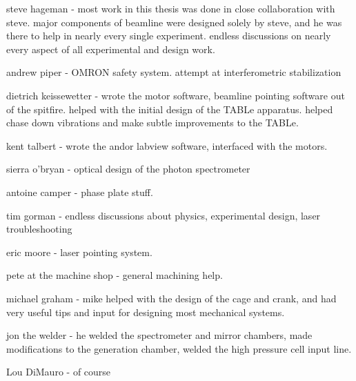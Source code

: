 \begin{acknowledgments}

steve hageman - most work in this thesis was done in close collaboration with steve. major components of beamline were designed solely by steve, and he was there to help in nearly every single experiment. endless discussions on nearly every aspect of all experimental and design work.

andrew piper - OMRON safety system. attempt at interferometric stabilization

dietrich keissewetter - wrote the motor software, beamline pointing software out of the spitfire. helped with the initial design of the TABLe apparatus. helped chase down vibrations and make subtle improvements to the TABLe.

kent talbert - wrote the andor labview software, interfaced with the motors.

sierra o'bryan - optical design of the photon spectrometer

antoine camper - phase plate stuff.

tim gorman - endless discussions about physics, experimental design, laser 
troubleshooting

eric moore - laser pointing system.

pete at the machine shop - general machining help.

michael graham - mike helped with the design of the cage and crank, and had very useful tips and input for designing most mechanical systems.

jon the welder - he welded the spectrometer and mirror chambers, made modifications to the generation chamber, welded the high pressure cell input line.

Lou DiMauro - of course

\end{acknowledgments}